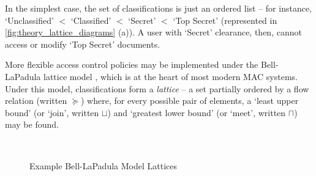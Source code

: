 In the simplest case, the set of classifications is just an ordered list -- for instance, `Unclassified' $ < $ `Classified' $ < $ `Secret' $ < $ `Top Secret' (represented in \autoref{fig:theory_lattice_diagrams} (a)). A user with `Secret' clearance, then, cannot access or modify `Top Secret' documents.

More flexible access control policies may be implemented under the Bell-LaPadula lattice model \cite{bell1973lattice}, which is at the heart of most modern MAC systems. Under this model, classifications form a \textit{lattice} -- a set partially ordered by a flow relation (written $ \succeq $) where, for every possible pair of elements, a `least upper bound' (or `join', written $ \sqcup $) and `greatest lower bound' (or `meet', written $ \sqcap $) may be found.

\begin{figure}[h!]
	\centering
	\begin{subfigure}[t]{0.2\textwidth}
		\caption{}
	\end{subfigure}
	~
	\begin{subfigure}[t]{0.1\textwidth}
		\caption{}
	\end{subfigure}
	\caption{Example Bell-LaPadula Model Lattices}
	\label{fig:theory_lattice_diagrams}
\end{figure}



